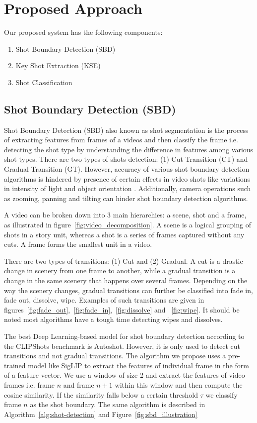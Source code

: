 \documentclass[12pt]{report}
\begin{document}
	\section{Proposed Approach}
	Our proposed system has the following components:
	\begin{enumerate}
		\item Shot Boundary Detection (SBD)
		\item Key Shot Extraction (KSE)
		\item Shot Classification
	\end{enumerate}
	\subsection{Shot Boundary Detection (SBD)}
	\cite{sbd} Shot Boundary Detection (SBD) also known as shot segmentation is the process of extracting features from frames of a videos and then classify the frame i.e. detecting the shot type by understanding the difference in features among various shot types. There are two types of shots detection: (1) Cut Transition (CT) and Gradual Transition (GT). However, accuracy of various shot boundary detection algorithms is hindered by presence of certain effects in video shots like variations in intensity of light and object orientation . Additionally, camera operations such as zooming, panning and tilting can hinder shot boundary detection algorithms.
	
	A video can be broken down into 3 main hierarchies: a scene, shot and a frame, as illustrated in  figure~\ref{fig:video_decomposition}. A scene is a logical grouping of shots in a story unit, whereas a shot is a series of frames captured without any cuts. A frame forms the smallest unit in a video.
	
	There are two types of transitions: (1) Cut and (2) Gradual. A cut is a drastic change in scenery from one frame to another, while a gradual transition is a change in the same scenery that happens over several frames. Depending on the way the scenery changes, gradual transitions can further be classified into fade in, fade out,  dissolve, wipe. Examples of such transitions are given in figures~\ref{fig:fade_out},~\ref{fig:fade_in},~\ref{fig:dissolve} and ~\ref{fig:wipe}. It should be noted most algorithms have a tough time detecting wipes and dissolves. 
	
	The best Deep Learning-based model for shot boundary detection according to the CLIPShots benchmark is Autoshot. However, it is only used to detect cut transitions and not gradual transitions. The algorithm we propose uses a pre-trained model like \cite{siglip} SigLIP to extract the features of individual frame in the form of a feature vector. We use a window of size 2 and extract the features of video frames i.e.  frame $n$ and frame $n+1$ within this window and then compute the cosine similarity. If the similarity falls below a certain threshold $\tau$ we classify  frame $n$ as the shot boundary. The same algorithm is described in Algorithm~\ref{alg:shot-detection} and Figure~\ref{fig:sbd_illustration}
	
\end{document}
